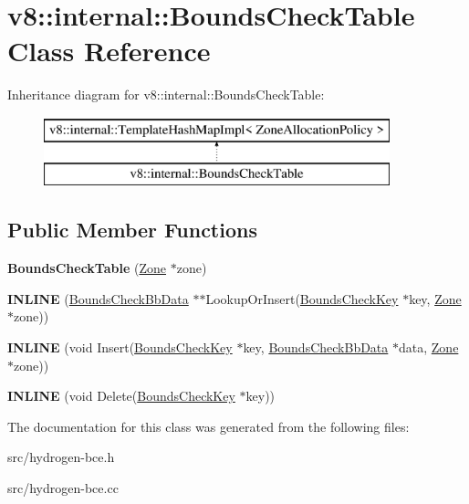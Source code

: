 \hypertarget{classv8_1_1internal_1_1_bounds_check_table}{}\section{v8\+:\+:internal\+:\+:Bounds\+Check\+Table Class Reference}
\label{classv8_1_1internal_1_1_bounds_check_table}
Inheritance diagram for v8\+:\+:internal\+:\+:Bounds\+Check\+Table\+:\begin{figure}[H]
\begin{center}
\leavevmode
\includegraphics[height=2.000000cm]{classv8_1_1internal_1_1_bounds_check_table}
\end{center}
\end{figure}
\subsection*{Public Member Functions}
\begin{DoxyCompactItemize}
\item 
\hypertarget{classv8_1_1internal_1_1_bounds_check_table_a249f9d0429a2642e46ee9839ed1592e8}{}{\bfseries Bounds\+Check\+Table} (\hyperlink{classv8_1_1internal_1_1_zone}{Zone} $\ast$zone)\label{classv8_1_1internal_1_1_bounds_check_table_a249f9d0429a2642e46ee9839ed1592e8}

\item 
\hypertarget{classv8_1_1internal_1_1_bounds_check_table_a0186a5444b781e695ea4f6bd85db9e2a}{}{\bfseries I\+N\+L\+I\+N\+E} (\hyperlink{classv8_1_1internal_1_1_bounds_check_bb_data}{Bounds\+Check\+Bb\+Data} $\ast$$\ast$Lookup\+Or\+Insert(\hyperlink{classv8_1_1internal_1_1_bounds_check_key}{Bounds\+Check\+Key} $\ast$key, \hyperlink{classv8_1_1internal_1_1_zone}{Zone} $\ast$zone))\label{classv8_1_1internal_1_1_bounds_check_table_a0186a5444b781e695ea4f6bd85db9e2a}

\item 
\hypertarget{classv8_1_1internal_1_1_bounds_check_table_a83d7e49a7bc1ed829d5601f26e6b584b}{}{\bfseries I\+N\+L\+I\+N\+E} (void Insert(\hyperlink{classv8_1_1internal_1_1_bounds_check_key}{Bounds\+Check\+Key} $\ast$key, \hyperlink{classv8_1_1internal_1_1_bounds_check_bb_data}{Bounds\+Check\+Bb\+Data} $\ast$data, \hyperlink{classv8_1_1internal_1_1_zone}{Zone} $\ast$zone))\label{classv8_1_1internal_1_1_bounds_check_table_a83d7e49a7bc1ed829d5601f26e6b584b}

\item 
\hypertarget{classv8_1_1internal_1_1_bounds_check_table_a4730123adb93e99d7501d8d4e9d3953f}{}{\bfseries I\+N\+L\+I\+N\+E} (void Delete(\hyperlink{classv8_1_1internal_1_1_bounds_check_key}{Bounds\+Check\+Key} $\ast$key))\label{classv8_1_1internal_1_1_bounds_check_table_a4730123adb93e99d7501d8d4e9d3953f}

\end{DoxyCompactItemize}


The documentation for this class was generated from the following files\+:\begin{DoxyCompactItemize}
\item 
src/hydrogen-\/bce.\+h\item 
src/hydrogen-\/bce.\+cc\end{DoxyCompactItemize}
